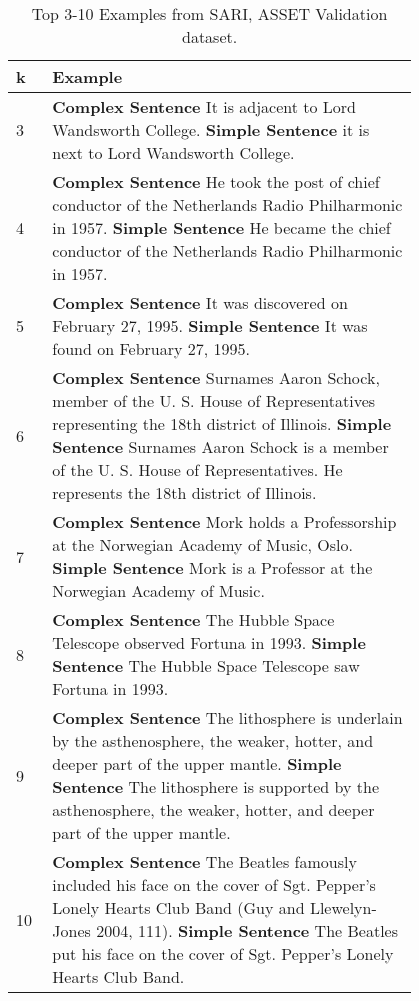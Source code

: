 \documentclass[11pt]{article}
\begin{document}
\begin{table*}[htbp]
\centering
\small
\renewcommand{\arraystretch}{1.5}
\begin{tabular}{p{0.05\linewidth} p{0.75\linewidth}} \toprule
k & Example \\ \midrule
3 & \textbf{Complex Sentence} It is adjacent to Lord Wandsworth College. \newline \textbf{Simple Sentence} it is next to Lord Wandsworth College.\\
\midrule
4 & \textbf{Complex Sentence} He took the post of chief conductor of the Netherlands Radio Philharmonic in 1957. \newline \textbf{Simple Sentence} He became the chief conductor of the Netherlands Radio Philharmonic in 1957.\\
\midrule
5 & \textbf{Complex Sentence} It was discovered on February 27, 1995. \newline \textbf{Simple Sentence} It was found on February 27, 1995.\\
\midrule
6 & \textbf{Complex Sentence} Surnames Aaron Schock, member of the U. S. House of Representatives representing the 18th district of Illinois. \newline \textbf{Simple Sentence} Surnames Aaron Schock is a member of the U. S. House of Representatives. He represents the 18th district of Illinois.\\
\midrule
7 & \textbf{Complex Sentence} Mork holds a Professorship at the Norwegian Academy of Music, Oslo. \newline \textbf{Simple Sentence} Mork is a Professor at the Norwegian Academy of Music.\\
\midrule
    8   & \textbf{Complex Sentence} The Hubble Space Telescope observed Fortuna in 1993.  \newline                                   \textbf{Simple Sentence}  The Hubble Space Telescope saw Fortuna in 1993.\\
    \midrule

    9   & \textbf{Complex Sentence} The lithosphere is underlain by the asthenosphere, the weaker, hotter, and deeper part of the upper mantle.  \newline                                   \textbf{Simple Sentence} The lithosphere is supported by the asthenosphere, the weaker, hotter, and deeper part of the upper mantle.\\
    \midrule

    10   & \textbf{Complex Sentence} The Beatles famously included his face on the cover of Sgt. Pepper's Lonely Hearts Club Band (Guy and Llewelyn-Jones 2004, 111).
  \newline                                   \textbf{Simple Sentence} The Beatles put his face on the cover of Sgt. Pepper's Lonely Hearts Club Band.\\ 
    \bottomrule
    \end{tabular}
    \caption{Top 3-10 Examples from SARI, ASSET Validation dataset.} 
    \label{tab:3to10sari}
\end{table*}
\end{document}
